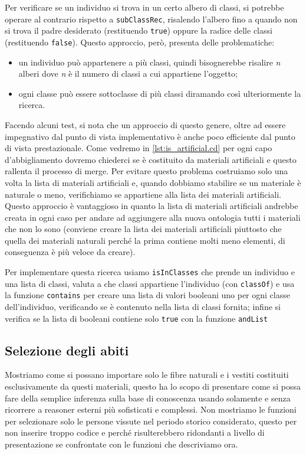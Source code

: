 Per verificare se un individuo si trova in un certo albero di classi, si potrebbe operare al contrario rispetto a \verb|subClassRec|, risalendo l'albero fino a quando non si trova il padre desiderato (restituendo \verb|true|) oppure la radice delle classi (restituendo \verb|false|). Questo approccio, però, presenta delle problematiche:
\begin{itemize}
	\item un individuo può appartenere a più classi, quindi bisognerebbe risalire \emph{n} alberi dove \emph{n} è il numero di classi a cui appartiene l'oggetto;
	\item ogni classe può essere sottoclasse di più classi diramando così ulteriormente la ricerca.
\end{itemize}
Facendo alcuni test, si nota che un approccio di questo genere, oltre ad essere impegnativo dal punto di vista implementativo è anche poco efficiente dal punto di vista prestazionale. Come vedremo in \ref{lst:is_artificial.cd} per ogni capo d'abbigliamento dovremo chiederci se è costituito da materiali artificiali e questo rallenta il processo di merge. Per evitare questo problema costruiamo solo una volta la lista di materiali artificiali e, quando dobbiamo stabilire se un materiale è naturale o meno, verifichiamo se appartiene alla lista dei materiali artificiali. Questo approccio è vantaggioso in quanto la lista di materiali artificiali andrebbe creata in ogni caso per andare ad aggiungere alla nuova ontologia tutti i materiali che non lo sono (conviene creare la lista dei materiali artificiali piuttosto che quella dei materiali naturali perché la prima contiene molti meno elementi, di conseguenza è più veloce da creare).

Per implementare questa ricerca usiamo \verb|isInClasses| che prende un individuo e una lista di classi, valuta a che classi appartiene l'individuo (con \verb|classOf|) e usa la funzione \verb|contains| per creare una lista di valori booleani uno per ogni classe dell'individuo, verificando se è contenuto nella lista di classi fornita; infine si verifica se la lista di booleani contiene solo \verb|true| con la funzione \verb|andList|

\subsection{Selezione degli abiti}
Mostriamo come si possano importare solo le fibre naturali e i vestiti costituiti esclusivamente da questi materiali, questo ha lo scopo di presentare come si possa fare della semplice inferenza sulla base di conoscenza usando solamente \cduce e senza ricorrere a reasoner esterni più sofisticati e complessi. Non mostriamo le funzioni per selezionare solo le persone vissute nel periodo storico considerato, questo per non inserire troppo codice e perché risulterebbero ridondanti a livello di presentazione se confrontate con le funzioni che descriviamo ora.

